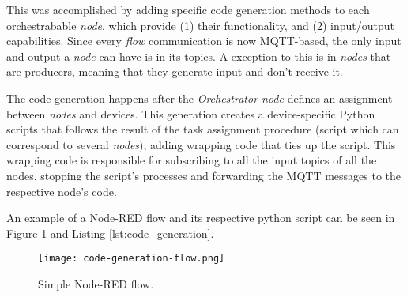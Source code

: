 This was accomplished by adding specific code generation methods to each orchestrabable \textit{node}, which provide (1) their functionality, and (2) input/output capabilities. Since every \textit{flow} communication is now MQTT-based, the only input and output a \textit{node} can have is in its topics. A exception to this is in \textit{nodes} that are producers, meaning that they generate input and don't receive it. 

The code generation happens after the \textit{Orchestrator node} defines an assignment between \textit{nodes} and devices. This generation creates a device-specific Python scripts that follows the result of the task assignment procedure (script which can correspond to several \textit{nodes}), adding wrapping code that ties up the script. This wrapping code is responsible for subscribing to all the input topics of all the nodes, stopping the script's processes and forwarding the MQTT messages to the respective node's code.

An example of a Node-RED flow and its respective python script can be seen in Figure \ref{fig:code_generation_flow} and Listing \ref{lst:code_generation}.

\begin{figure}[h]
    \centering
    \texttt{[image: code-generation-flow.png]}
    \caption{Simple Node-RED flow.}
    \label{fig:code_generation_flow}
\end{figure}


